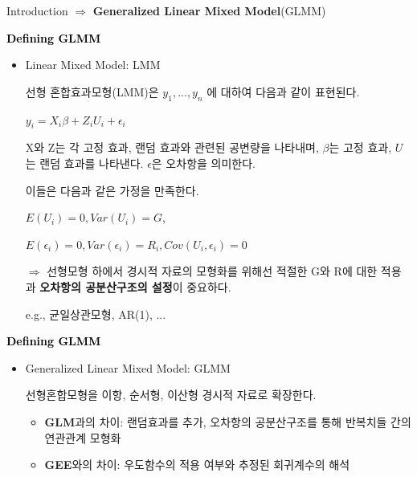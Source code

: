 \documentclass[9pt, xelatex]{beamer}
\begin{document}
{\begin{frame}[allowframebreaks]{Introduction}
	$\Longrightarrow$ \textbf{Generalized Linear Mixed Model}(GLMM)	
		\pagebreak
		
		
	\textcolor{black}{\textbf{Defining GLMM}}
	\vspace{2mm}
	\begin{itemize}
		\item Linear Mixed Model: LMM
		\vspace{3mm}
	
		선형 혼합효과모형(LMM)은	$ y_{1},...,y_{n} $ 에 대하여 다음과 같이 표현된다.
		
			\begin{center} $ y_{i}=X_{i}\beta+Z_{i}U_{i}+\epsilon_{i} $\end{center}

			X와 Z는 각 고정 효과, 랜덤 효과와 관련된 공변량을 나타내며, $\beta$는 고정 효과, $U$는 랜덤 효과를 나타낸다. $\epsilon$은 오차항을 의미한다.
			\vspace{3mm}
			
			이들은 다음과 같은 가정을 만족한다.
			
			 \begin{center}
			 	$E(U_{i})=0,Var(U_{i})=G$,
			 			
			    $E(\epsilon_{i})=0,		Var(\epsilon_{i})=R_{i},		Cov(U_{i},\epsilon_{i})=0$
			 \end{center}
			 \vspace{2mm}
			 
			 $\Rightarrow$ 선형모형 하에서 경시적 자료의 모형화를 위해선 적절한  G와 R에 대한 적용과 \textbf{오차항의 공분산구조의 설정}이 중요하다. 
			 \vspace{2mm}
			 
			 e.g., 균일상관모형, AR(1), ...
	\end{itemize}
		\pagebreak
		
		
		\textcolor{black}{\textbf{Defining GLMM}}
		\vspace{2mm}
	\begin{itemize}
			\item Generalized Linear Mixed Model: GLMM
			\vspace{3mm}
			
			선형혼합모형을 이항, 순서형, 이산형 경시적 자료로 확장한다.
			\begin{center}
				\begin{itemize}
					\item \textbf{GLM}과의 차이: 랜덤효과를 추가, 오차항의 공분산구조를 통해 반복치들 간의 연관관계 모형화
					\item \textbf{GEE}와의 차이: 우도함수의 적용 여부와 추정된 회귀계수의 해석
				\end{itemize}
			\end{center}
			

\end{itemize}
\end{frame}}
\end{document}
